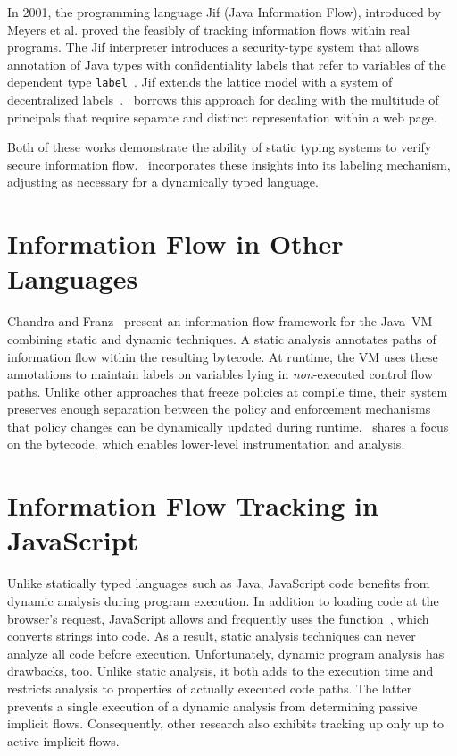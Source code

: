 In 2001, the programming language Jif (Java Information Flow), introduced by Meyers et al.\cite{jif} proved the feasibly of tracking information flows within real programs.
The Jif interpreter introduces a security-type system that allows annotation of Java types with confidentiality labels that refer to variables of the dependent type \texttt{label}~\cite{sabelfeld.myers+03}.
Jif extends the lattice model with a system of decentralized labels~\cite{myers.liskov+00}.
\JitFlow\ borrows this approach for dealing with the multitude of principals that require separate and distinct representation within a web page.

Both of these works demonstrate the ability of static typing systems to verify secure information flow.
\JitFlow\ incorporates these insights into its labeling mechanism, adjusting as necessary for a dynamically typed language.

\section{Information Flow in Other Languages}

Chandra and Franz~\cite{chandra.franz+07} present an information flow framework for the Java~VM combining static and dynamic techniques.
A static analysis annotates paths of information flow within the resulting bytecode.
At runtime, the VM uses these annotations to maintain labels on variables lying in \emph{non}-executed control flow paths.
Unlike other approaches that freeze policies at compile time, their system preserves enough separation between the policy and enforcement mechanisms that policy changes can be dynamically updated during runtime.
\JitFlow\ shares a focus on the bytecode, which enables lower-level instrumentation and analysis.

\section{Information Flow Tracking in JavaScript}

Unlike statically typed languages such as Java, JavaScript code benefits from dynamic analysis during program execution.
In addition to loading code at the browser's request, JavaScript allows and frequently uses the  function~\cite{nikiforakis.etal+12}, which converts strings into code.
As a result, static analysis techniques can never analyze all code before execution.
Unfortunately, dynamic program analysis has drawbacks, too.
Unlike static analysis, it both adds to the execution time and restricts analysis to properties of actually executed code paths.
The latter prevents a single execution of a dynamic analysis from determining passive implicit flows.
Consequently, other research also exhibits tracking up only up to active implicit flows.

